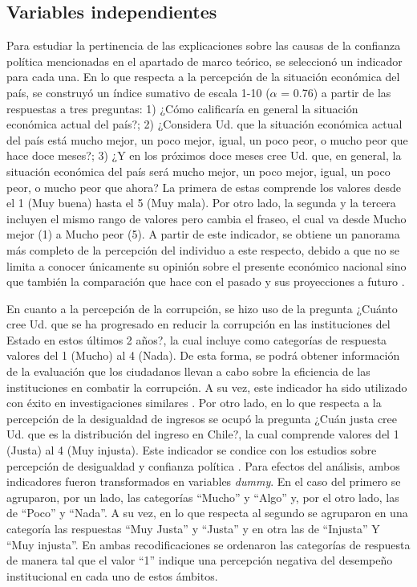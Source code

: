 \documentclass[12pt,twoside]{templates/facsothesis}
\begin{document}
\subsection{Variables independientes}\label{variables-independientes}

Para estudiar la pertinencia de las explicaciones sobre las causas de la confianza política mencionadas en el apartado de marco teórico, se seleccionó un indicador para cada una. En lo que respecta a la percepción de la situación económica del país, se construyó un índice sumativo de escala 1-10 (\(\alpha\) = 0.76) a partir de las respuestas a tres preguntas: 1) ¿Cómo calificaría en general la situación económica actual del país?; 2) ¿Considera Ud. que la situación económica actual del país está mucho mejor, un poco mejor, igual, un poco peor, o mucho peor que hace doce meses?; 3) ¿Y en los próximos doce meses cree Ud. que, en general, la situación económica del país será mucho mejor, un poco mejor, igual, un poco peor, o mucho peor que ahora? La primera de estas comprende los valores desde el 1 (Muy buena) hasta el 5 (Muy mala). Por otro lado, la segunda y la tercera incluyen el mismo rango de valores pero cambia el fraseo, el cual va desde Mucho mejor (1) a Mucho peor (5). A partir de este indicador, se obtiene un panorama más completo de la percepción del individuo a este respecto, debido a que no se limita a conocer únicamente su opinión sobre el presente económico nacional sino que también la comparación que hace con el pasado y sus proyecciones a futuro \citep{saldanazunigaConfianzaInstitucionesPoliticas2019}.

En cuanto a la percepción de la corrupción, se hizo uso de la pregunta ¿Cuánto cree Ud. que se ha progresado en reducir la corrupción en las instituciones del Estado en estos últimos 2 años?, la cual incluye como categorías de respuesta valores del 1 (Mucho) al 4 (Nada). De esta forma, se podrá obtener información de la evaluación que los ciudadanos llevan a cabo sobre la eficiencia de las instituciones en combatir la corrupción. A su vez, este indicador ha sido utilizado con éxito en investigaciones similares \citep{andrianiInstitutionalTrustCorruption2021}. Por otro lado, en lo que respecta a la percepción de la desigualdad de ingresos se ocupó la pregunta ¿Cuán justa cree Ud. que es la distribución del ingreso en Chile?, la cual comprende valores del 1 (Justa) al 4 (Muy injusta). Este indicador se condice con los estudios sobre percepción de desigualdad y confianza política \citep{leeEconomicPerformanceIncome2020, wuIncomeInequalityDistributive2019, zmerliIncomeInequalityDistributive2015}. Para efectos del análisis, ambos indicadores fueron transformados en variables \emph{dummy}. En el caso del primero se agruparon, por un lado, las categorías ``Mucho'' y ``Algo'' y, por el otro lado, las de ``Poco'' y ``Nada''. A su vez, en lo que respecta al segundo se agruparon en una categoría las respuestas ``Muy Justa'' y ``Justa'' y en otra las de ``Injusta'' Y ``Muy injusta''. En ambas recodificaciones se ordenaron las categorías de respuesta de manera tal que el valor ``1'' indique una percepción negativa del desempeño institucional en cada uno de estos ámbitos.
\end{document}
